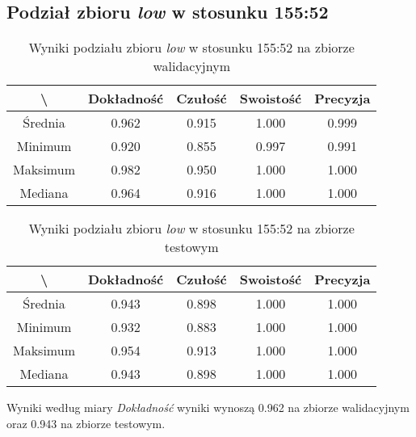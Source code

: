 \subsection{Podział zbioru \textit{low} w stosunku 155:52}


\begin{table}[H]
	\centering
	\caption{Wyniki podziału zbioru \textit{low} w stosunku 155:52 na zbiorze walidacyjnym}
	\vspace{6pt}
	{\footnotesize
		\begin{tabular}{|c|c|c|c|c|}
      \hline \textbackslash & Dokładność & Czułość & Swoistość & Precyzja \\
      \hline Średnia & 0.962 & 0.915 & 1.000 & 0.999 \\
      \hline Minimum & 0.920 & 0.855 & 0.997 & 0.991 \\
      \hline Maksimum & 0.982 & 0.950 & 1.000 & 1.000 \\
      \hline Mediana & 0.964 & 0.916 & 1.000 & 1.000 \\
      \hline
    \end{tabular}
    \label{Tab:lowsplitc_val}
	}
	\vspace{0pt}
\end{table}

\begin{table}[H]
	\centering
	\caption{Wyniki podziału zbioru \textit{low} w stosunku 155:52 na zbiorze testowym}
	\vspace{6pt}
	{\footnotesize
		\begin{tabular}{|c|c|c|c|c|}
      \hline \textbackslash & Dokładność & Czułość & Swoistość & Precyzja \\
      \hline Średnia & 0.943 & 0.898 & 1.000 & 1.000 \\
      \hline Minimum & 0.932 & 0.883 & 1.000 & 1.000 \\
      \hline Maksimum & 0.954 & 0.913 & 1.000 & 1.000 \\
      \hline Mediana & 0.943 & 0.898 & 1.000 & 1.000 \\
      \hline
    \end{tabular}
    \label{Tab:lowsplitc_test}
	}
	\vspace{0pt}
\end{table}

Wyniki według miary \textit{Dokładność} wyniki wynoszą 0.962 na zbiorze walidacyjnym oraz 0.943 na zbiorze testowym.
